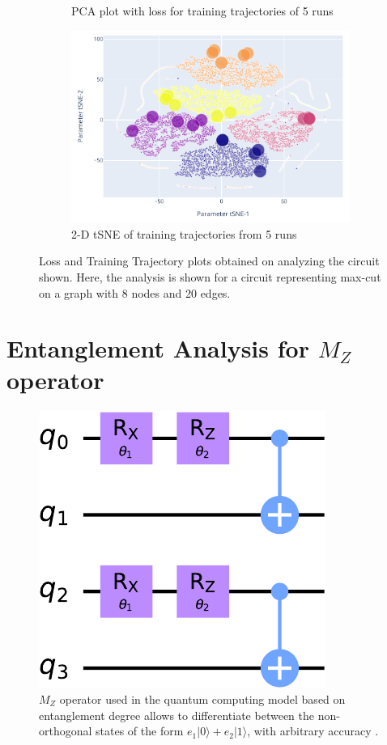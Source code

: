\begin{figure}[htp]
\begin{subfigure}[b]{0.32\linewidth}
        \caption{PCA plot with loss for training trajectories of 5 runs}
    \end{subfigure}
    \begin{subfigure}[b]{0.32\linewidth}
        \includegraphics[width=\textwidth]{figures/qleet/supplementary-qleet-3.pdf}
        \caption{2-D tSNE of training trajectories from 5 runs}
    \end{subfigure}%
    \caption{Loss and Training Trajectory plots obtained on analyzing the circuit shown. Here, the analysis is shown for a circuit representing max-cut on a graph with 8 nodes and 20 edges.}
    \label{fig:loss-land-train-traj}
\end{figure}

\section{\label{sec:supl-mz-op}Entanglement Analysis for $M_Z$ operator \cite{Zidan2020}}

\begin{figure}
    \centering
    \includegraphics{figures/qleet/mzop_circuit.pdf}
    \caption{$M_Z$ operator used in the quantum computing model based on entanglement degree allows to differentiate between the non-orthogonal states of the form $e_1|0\rangle + e_2|1\rangle$, with arbitrary accuracy \cite{Zidan2020, Khan2022, Punla2021, Panda2022}.}
    \label{fig:my_label}
\end{figure}

